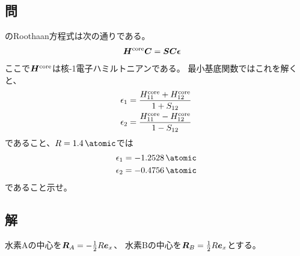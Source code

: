 \subsection{問}
のRoothaan方程式は次の通りである。
\begin{align}
	\bm{H}^{\rm core}
	\bm{C}
&=
	\bm{S}
	\bm{C}
	\bm{\epsilon}
\end{align}
ここで$\bm{H}^{\rm core}$は核-1電子ハミルトニアンである。
最小基底関数ではこれを解くと、
\begin{align}
	\epsilon_1
&=
	\frac{
		H_{11}^{\rm core}
		+
		H_{12}^{\rm core}
	}{
		1
		+
		S_{12}
	} \\
%
%
	\epsilon_2
&=
	\frac{
		H_{11}^{\rm core}
		-
		H_{12}^{\rm core}
	}{
		1
		-
		S_{12}
	}
\end{align}
であること、$R=\SI{1.4}{\atomic}$では
\begin{align}
	\epsilon_1
&=
	\SI{-1.2528}{\atomic} \\
%
%
	\epsilon_2
&=
	\SI{-0.4756}{\atomic}
\end{align}
であること示せ。


\subsection{解}
水素Aの中心を$\bm{R}_A=-\frac{1}{2}R{\bm{e}_{x}}$、
水素Bの中心を$\bm{R}_B=\frac{1}{2}R{\bm{e}_{x}}$とする。

